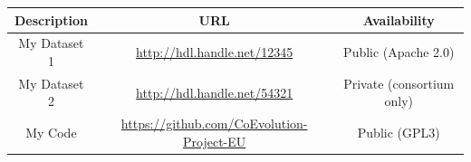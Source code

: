 \begin{center}
    \def\arraystretch{1.25}		
    \begin{tabular}{|c|c|c|}
        \hline
        \rowcolor{hyperridegray}
        \color{white} Description & 
        \color{white} URL & 
        \color{white} Availability 
        \\\hline
    
        \rowcolor{white}\color{hyperridefont} 
        My Dataset 1 &  
        \url{http://hdl.handle.net/12345} &
        Public (Apache 2.0) \\
    
        \rowcolor{hyperridelightergray}\color{hyperridefont} 
        My Dataset 2 &  
        \url{http://hdl.handle.net/54321} &
        Private (consortium only) \\
    
        \rowcolor{white}\color{hyperridefont} 
        My Code &  
        \url{https://github.com/CoEvolution-Project-EU} &
        Public (GPL3) \\
    
        \hline
    \end{tabular}
\end{center}

